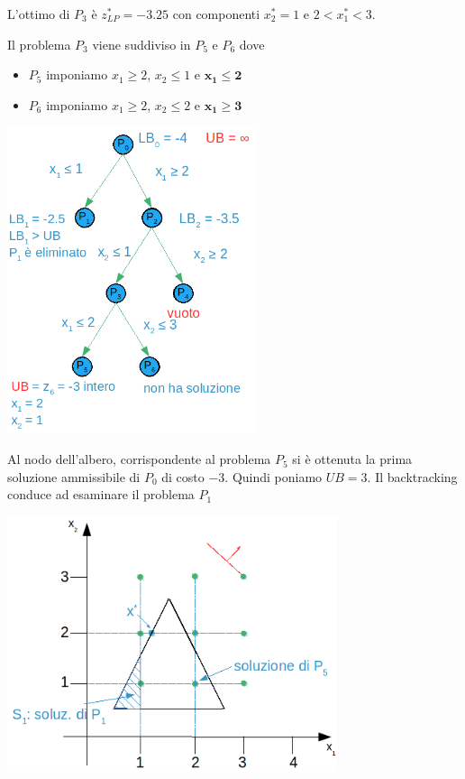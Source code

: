 L'ottimo di $P_{3}$ è $z_{LP}^{*}=-3.25$ con componenti $x_{2}^{*}=1$ e $2 < x_{1}^{*} < 3$.

Il problema $P_{3}$ viene suddiviso in $P_{5}$ e $P_{6}$ dove
\begin{itemize}
	\item $P_{5}$ imponiamo $x_{1}\ge 2$, $x_{2}\le 1$ e \underline{$\boldsymbol{x_{1}\le 2}$}
	\item $P_{6}$ imponiamo $x_{1}\ge 2$, $x_{2}\le 2$ e \underline{$\boldsymbol{x_{1}\ge 3}$}
\end{itemize}

\centerline{\includegraphics[height=9cm]{images/graph24.png}}

Al nodo dell'albero, corrispondente al problema $P_{5}$ si è ottenuta la prima soluzione ammissibile di $P_{0}$ di costo $-3$. Quindi poniamo \textbf{$UB = 3$}.\newline
Il backtracking conduce ad esaminare il problema $P_{1}$

\centerline{\includegraphics[height=7.5cm]{images/graph25.png}}

